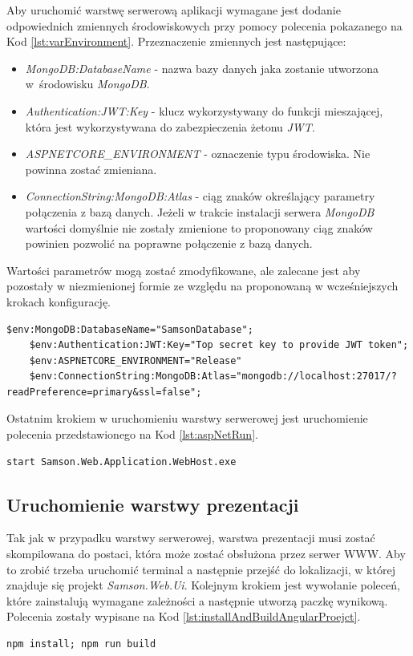 \documentclass[a4paper,twoside,12pt]{book}
\begin{document}
Aby uruchomić warstwę serwerową aplikacji wymagane jest dodanie odpowiednich zmiennych środowiskowych przy pomocy polecenia pokazanego na Kod \ref{lst:varEnvironment}. Przeznaczenie zmiennych jest następujące:
\begin{itemize}
	\item \textit{MongoDB:DatabaseName} - nazwa bazy danych jaka zostanie utworzona w~środowisku \textit{MongoDB}.
	\item \textit{Authentication:JWT:Key} - klucz wykorzystywany do funkcji mieszającej, która jest wykorzystywana do zabezpieczenia żetonu \textit{JWT}.
	\item \textit{ASPNETCORE\_ENVIRONMENT} - oznaczenie typu środowiska. Nie powinna zostać zmieniana.
	\item \textit{ConnectionString:MongoDB:Atlas} - ciąg znaków określający parametry połączenia z bazą danych. Jeżeli w trakcie instalacji serwera \textit{MongoDB} wartości domyślnie nie zostały zmienione to proponowany ciąg znaków powinien pozwolić na poprawne połączenie z bazą danych.
\end{itemize}
Wartości parametrów mogą zostać zmodyfikowane, ale zalecane jest aby pozostały w niezmienionej formie ze względu na proponowaną w wcześniejszych krokach konfigurację.
\begin{lstlisting}[caption={Ustawienie wartości zmiennych środowiskowych}, label={lst:varEnvironment}]
	$env:MongoDB:DatabaseName="SamsonDatabase";
	$env:Authentication:JWT:Key="Top secret key to provide JWT token";
	$env:ASPNETCORE_ENVIRONMENT="Release"
	$env:ConnectionString:MongoDB:Atlas="mongodb://localhost:27017/?readPreference=primary&ssl=false";
\end{lstlisting}

Ostatnim krokiem w uruchomieniu warstwy serwerowej jest uruchomienie polecenia przedstawionego na Kod \ref{lst:aspNetRun}.
\begin{lstlisting}[caption={Uruchomienie warstwy serwerowej aplikacji}, label={lst:aspNetRun}]
	start Samson.Web.Application.WebHost.exe
\end{lstlisting}

\subsection{Uruchomienie warstwy prezentacji}
Tak jak w przypadku warstwy serwerowej, warstwa prezentacji musi zostać skompilowana do postaci, która może zostać obsłużona przez serwer WWW. Aby to zrobić trzeba uruchomić terminal a następnie przejść do lokalizacji, w której znajduje się projekt \textit{Samson.Web.Ui}. Kolejnym krokiem jest wywołanie poleceń, które zainstalują wymagane zależności a następnie utworzą paczkę wynikową. Polecenia zostały wypisane na Kod \ref{lst:installAndBuildAngularProejct}.
\begin{lstlisting}[caption={Polecenie, które tworzy paczkę możliwą do uruchomienia przez serwer WWW}, label={lst:installAndBuildAngularProejct}]
	npm install; npm run build
\end{lstlisting}
\end{document}
